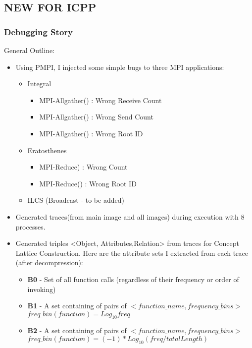 

\subsection{NEW FOR ICPP}

\subsubsection{Debugging Story}

General Outline:

\begin{itemize}
\item Using PMPI, I injected some simple bugs to three MPI applications:
	\begin{itemize}
	\item Integral
		\begin{itemize}
		\item MPI-Allgather() : Wrong Receive Count
		\item MPI-Allgather() : Wrong Send Count
		\item MPI-Allgather() : Wrong Root ID
		\end{itemize}
	\item Eratosthenes
		\begin{itemize}
		\item MPI-Reduce) : Wrong  Count
		\item MPI-Reduce() : Wrong Root ID
		\end{itemize}
	\item ILCS (Broadcast - to be added)
	\end{itemize}
\item Generated traces(from main image and all images) during execution with 8 processes.
\item Generated triples <Object, Attributes,Relation> from traces for Concept Lattice Construction. Here are the attribute sets I extracted from each trace (after decompression):
	\begin{itemize}
	\item \textbf{B0} - Set of all function calls (regardless of their frequency or order of invoking)
	\item \textbf{B1} - A set containing of pairs of $<function\_name,frequency\_bins>$\\
	$freq\_bin(function) = Log_\text{10}freq$
	\item \textbf{B2} - A set containing of pairs of $<function\_name,frequency\_bins>$\\
		$freq\_bin(function) = (-1) * Log_\text{10}(freq/totalLength)$
	

\end{itemize}
\end{itemize}
